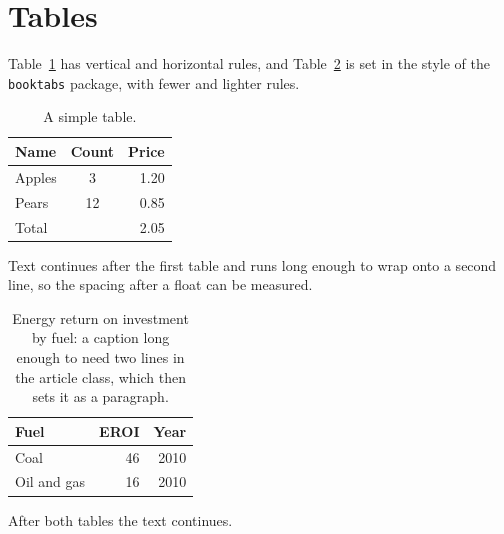 \documentclass[11pt,a4paper]{article}
\begin{document}
\section{Tables}
Table~\ref{tab:simple} has vertical and horizontal rules, and
Table~\ref{tab:booktabs} is set in the style of the \texttt{booktabs}
package, with fewer and lighter rules.

\begin{table}[h]
\centering
\caption{A simple table.}
\label{tab:simple}
\begin{tabular}{|l|c|r|}
\hline
Name & Count & Price \\
\hline
Apples & 3 & 1.20 \\
Pears & 12 & 0.85 \\
\hline
\multicolumn{2}{|l|}{Total} & 2.05 \\
\hline
\end{tabular}
\end{table}

Text continues after the first table and runs long enough to wrap onto a
second line, so the spacing after a float can be measured.

\begin{table}[h]
\centering
\caption{Energy return on investment by fuel: a caption long enough to need
two lines in the article class, which then sets it as a paragraph.}
\label{tab:booktabs}
\begin{tabular}{@{}lrr@{}}
\toprule
Fuel & EROI & Year \\
\midrule
Coal & 46 & 2010 \\
Oil and gas & 16 & 2010 \\
\bottomrule
\end{tabular}
\end{table}

After both tables the text continues.
\end{document}
